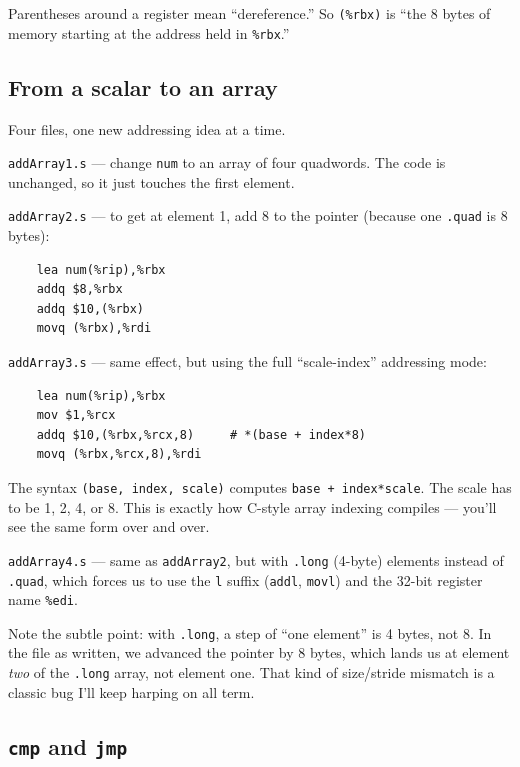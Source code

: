 \documentclass[11pt]{article}
\begin{document}
Parentheses around a register mean ``dereference.'' So \texttt{(\%rbx)}
is ``the 8 bytes of memory starting at the address held in
\texttt{\%rbx}.''

\subsection*{From a scalar to an array}

Four files, one new addressing idea at a time.

\texttt{addArray1.s} --- change \texttt{num} to an array of four
quadwords. The code is unchanged, so it just touches the first element.

\texttt{addArray2.s} --- to get at element 1, add 8 to the pointer
(because one \texttt{.quad} is 8 bytes):

\begin{lstlisting}
    lea num(%rip),%rbx
    addq $8,%rbx
    addq $10,(%rbx)
    movq (%rbx),%rdi
\end{lstlisting}

\texttt{addArray3.s} --- same effect, but using the full ``scale-index''
addressing mode:

\begin{lstlisting}
    lea num(%rip),%rbx
    mov $1,%rcx
    addq $10,(%rbx,%rcx,8)     # *(base + index*8)
    movq (%rbx,%rcx,8),%rdi
\end{lstlisting}

The syntax \texttt{(base, index, scale)} computes
\texttt{base + index*scale}. The scale has to be 1, 2, 4, or 8. This
is exactly how C-style array indexing compiles --- you'll see the same
form over and over.

\texttt{addArray4.s} --- same as \texttt{addArray2}, but with
\texttt{.long} (4-byte) elements instead of \texttt{.quad}, which
forces us to use the \texttt{l} suffix (\texttt{addl},
\texttt{movl}) and the 32-bit register name \texttt{\%edi}.

Note the subtle point: with \texttt{.long}, a step of ``one element''
is 4 bytes, not 8. In the file as written, we advanced the pointer by
8 bytes, which lands us at element \emph{two} of the \texttt{.long}
array, not element one. That kind of size/stride mismatch is a classic
bug I'll keep harping on all term.

\subsection*{\texttt{cmp} and \texttt{jmp}}
\end{document}
